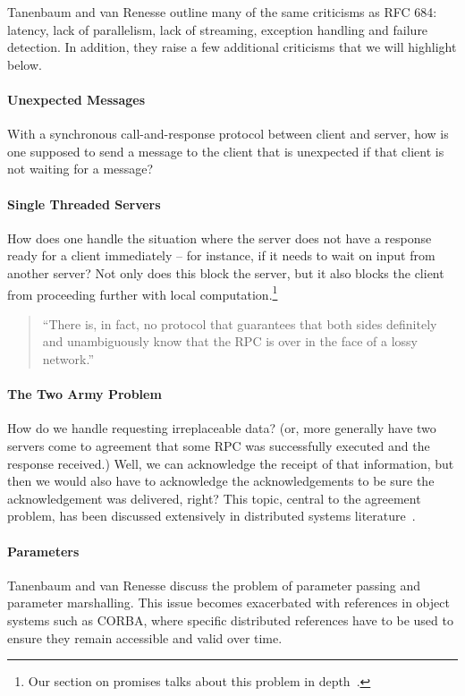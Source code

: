 Tanenbaum and van Renesse outline many of the same criticisms as RFC 684: latency, lack of parallelism, lack of streaming, exception handling and failure detection.  In addition, they raise a few additional criticisms that we will highlight below.

\paragraph{Unexpected Messages} With a synchronous call-and-response protocol between client and server, how is one supposed to send a message to the client that is unexpected if that client is not waiting for a message?
\paragraph{Single Threaded Servers} How does one handle the situation where the server does not have a response ready for a client immediately -- for instance, if it needs to wait on input from another server?  Not only does this block the server, but it also blocks the client from proceeding further with local computation.\footnote{Our section on promises talks about this problem in depth~\cite{liskov1988promises}.}

\begin{quote}
``There is, in fact, no protocol that guarantees that both sides definitely and unambiguously know that the RPC is over in the face of a lossy network.''~\cite{tanenbaum1987critique}
\end{quote}

\paragraph{The Two Army Problem} How do we handle requesting irreplaceable data?  (or, more generally have two servers come to agreement that some RPC was successfully executed and the response received.) Well, we can acknowledge the receipt of that information, but then we would also have to acknowledge the acknowledgements to be sure the acknowledgement was delivered, right?  This topic, central to the agreement problem, has been discussed extensively in distributed systems literature~\cite{halpern1990knowledge}.

\paragraph{Parameters} Tanenbaum and van Renesse discuss the problem of parameter passing and parameter marshalling.  This issue becomes exacerbated with references in object systems such as CORBA, where specific distributed references have to be used to ensure they remain accessible and valid over time.


